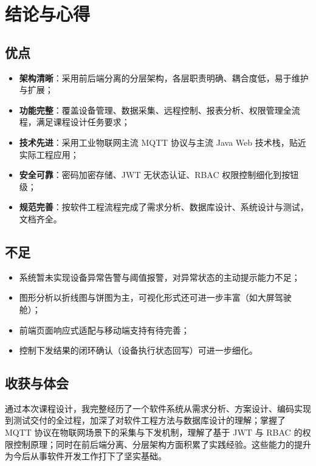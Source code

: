 \documentclass[12pt,hyperref,a4paper,UTF8]{ctexart}
\begin{document}
\FloatBarrier

\section{结论与心得}

\subsection{优点}

\begin{itemize}
    \item \textbf{架构清晰}：采用前后端分离的分层架构，各层职责明确、耦合度低，易于维护与扩展；
    \item \textbf{功能完整}：覆盖设备管理、数据采集、远程控制、报表分析、权限管理全流程，满足课程设计任务要求；
    \item \textbf{技术先进}：采用工业物联网主流 MQTT 协议与主流 Java Web 技术栈，贴近实际工程应用；
    \item \textbf{安全可靠}：密码加密存储、JWT 无状态认证、RBAC 权限控制细化到按钮级；
    \item \textbf{规范完善}：按软件工程流程完成了需求分析、数据库设计、系统设计与测试，文档齐全。
\end{itemize}

\subsection{不足}

\begin{itemize}
    \item 系统暂未实现设备异常告警与阈值报警，对异常状态的主动提示能力不足；
    \item 图形分析以折线图与饼图为主，可视化形式还可进一步丰富（如大屏驾驶舱）；
    \item 前端页面响应式适配与移动端支持有待完善；
    \item 控制下发结果的闭环确认（设备执行状态回写）可进一步细化。
\end{itemize}

\subsection{收获与体会}

通过本次课程设计，我完整经历了一个软件系统从需求分析、方案设计、编码实现到测试交付的全过程，加深了对软件工程方法与数据库设计的理解；掌握了 MQTT 协议在物联网场景下的采集与下发机制，理解了基于 JWT 与 RBAC 的权限控制原理；同时在前后端分离、分层架构方面积累了实践经验。这些能力的提升为今后从事软件开发工作打下了坚实基础。
\end{document}
